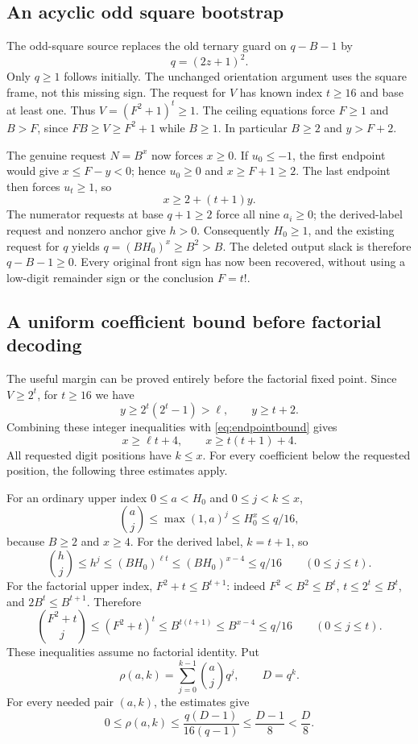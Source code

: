 \subsection{An acyclic odd square bootstrap}
The odd-square source replaces the old ternary guard on $q-B-1$ by
\begin{equation}\label{eq:odd-square}
 q=(2z+1)^2.
\end{equation}
Only $q\ge1$ follows initially. The unchanged orientation argument uses
the square frame, not this missing sign. The request for $V$ has known
index $t\ge16$ and base at least one. Thus $V=(F^2+1)^t\ge1$.
The ceiling equations force $F\ge1$ and $B>F$, since
$FB\ge V\ge F^2+1$ while $B\ge1$. In particular $B\ge2$ and
$y>F+2$.

The genuine request $N=B^x$ now forces $x\ge0$. If $u_0\le-1$, the
first endpoint would give $x\le F-y<0$; hence $u_0\ge0$ and
$x\ge F+1\ge2$. The last endpoint then forces $u_t\ge1$, so
\begin{equation}\label{eq:endpointbound}
 x\ge2+(t+1)y.
\end{equation}
The numerator requests at base $q+1\ge2$ force all nine $a_i\ge0$;
the derived-label request and nonzero anchor give $h>0$. Consequently
$H_0\ge1$, and the existing request for $q$ yields
$q=(BH_0)^x\ge B^2>B$. The deleted output slack is therefore
$q-B-1\ge0$. Every original front sign has now been recovered, without
using a low-digit remainder sign or the conclusion $F=t!$.

\subsection{A uniform coefficient bound before factorial decoding}
The useful margin can be proved entirely before the factorial fixed point.
Since $V\ge2^t$, for $t\ge16$ we have
\[
 y\ge2^t(2^t-1)>\ell,\qquad y\ge t+2.
\]
Combining these integer inequalities with \eqref{eq:endpointbound} gives
\begin{equation}\label{eq:gaps}
 x\ge\ell t+4,\qquad x\ge t(t+1)+4.
\end{equation}
All requested digit positions have $k\le x$. For every coefficient below
the requested position, the following three estimates apply.

For an ordinary upper index $0\le a<H_0$ and $0\le j<k\le x$,
\[
 \binom aj\le\max(1,a)^j\le H_0^x\le q/16,
\]
because $B\ge2$ and $x\ge4$. For the derived label, $k=t+1$, so
\[
 \binom hj\le h^j\le(BH_0)^{\ell t}
 \le(BH_0)^{x-4}\le q/16\qquad(0\le j\le t).
\]
For the factorial upper index, $F^2+t\le B^{t+1}$: indeed
$F^2<B^2\le B^t$, $t\le2^t\le B^t$, and $2B^t\le B^{t+1}$.
Therefore
\[
 \binom{F^2+t}{j}\le(F^2+t)^t\le B^{t(t+1)}
 \le B^{x-4}\le q/16\qquad(0\le j\le t).
\]
These inequalities assume no factorial identity. Put
\[
 \rho(a,k)=\sum_{j=0}^{k-1}\binom ajq^j,\qquad D=q^k.
\]
For every needed pair $(a,k)$, the estimates give
\begin{equation}\label{eq:smalltail}
 0\le\rho(a,k)\le\frac{q(D-1)}{16(q-1)}
 \le\frac{D-1}{8}<\frac D8.
\end{equation}

